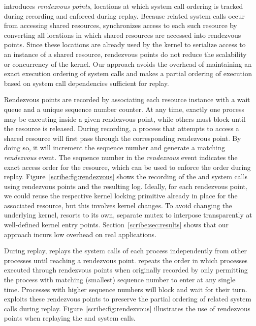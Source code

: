 \scribe{} introduces {\em rendezvous points}, locations at which
system call ordering is tracked during recording and enforced during
replay.  Because related system calls occur from accessing shared
resources, \scribe{} synchronizes access to each such resource by
converting all locations in which shared resources are accessed into
rendezvous points.  Since these locations are already used by the
kernel to serialize access to an instance of a shared resource,
rendezvous points do not reduce the scalability or concurrency of the
kernel.  Our approach avoids the overhead of maintaining an exact
execution ordering of system calls and makes a partial ordering of
execution based on system call dependencies sufficient for replay.

  

Rendezvous points are recorded by associating each resource instance 
with a wait queue and a unique sequence number counter. At
any time, exactly one process may be executing inside a given
rendezvous point, while others must block until the resource is
released.  During recording, a process that attempts to access a
shared resource will first pass through the corresponding rendezvous
point.  By doing so, it will increment the sequence number and
generate a matching {\em rendezvous} event. The sequence number in the
{\em rendezvous} event indicates the exact access order for the
resource, which can be used to enforce the order during replay.
Figure~\ref{scribe:fig:rendezvous} shows the recording of
the  and  system calls using rendezvous points
and the resulting log. 
Ideally, for each rendezvous point, we could reuse the respective
kernel locking primitive already in place for the associated
resource, but this involves kernel changes.  To avoid changing the
underlying kernel, \scribe{} resorts to its own, separate mutex to
interpose transparently at well-defined kernel entry points.
Section~\ref{scribe:sec:results} shows that our approach incurs low overhead
on real applications. 

During replay, \scribe{} replays the system calls of each process
independently from other processes until reaching a rendezvous point.
\scribe{} repeats the order in which processes executed through
rendezvous points when originally recorded by only permitting the
process with matching (smallest) sequence number to enter at any
single time. Processes with higher sequence numbers will block and
wait for their turn.  \scribe{} exploits these rendezvous points to
preserve the partial ordering of related system calls during replay.
Figure~\ref{scribe:fig:rendezvous} illustrates the use of rendezvous points
when replaying the  and  system calls.

